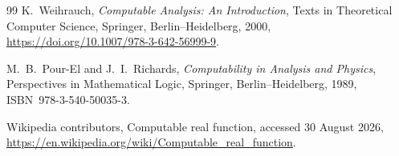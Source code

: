 \begin{thebibliography}{99}
K.~Weihrauch,
\newblock \emph{Computable Analysis: An Introduction},
\newblock Texts in Theoretical Computer Science, Springer, Berlin--Heidelberg,
2000,
\newblock \url{https://doi.org/10.1007/978-3-642-56999-9}.

M.~B.~Pour-El and J.~I.~Richards,
\newblock \emph{Computability in Analysis and Physics},
\newblock Perspectives in Mathematical Logic, Springer, Berlin--Heidelberg,
1989, ISBN~978-3-540-50035-3.

Wikipedia contributors,
\newblock Computable real function,
\newblock accessed 30 August 2026,
\newblock \url{https://en.wikipedia.org/wiki/Computable_real_function}.

\end{thebibliography}
